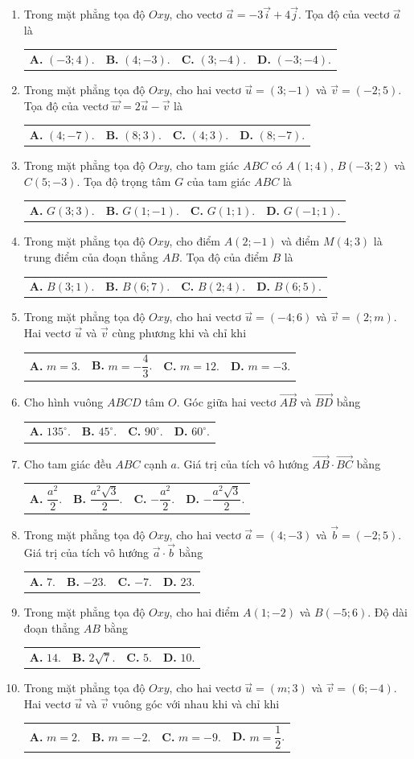 \documentclass[10pt,a4paper]{article}
\makeatletter
\newcommand{\four}[4]{\par\noindent\begin{tabularx}{\linewidth}{@{}*{4}{>{\raggedright\arraybackslash}X}@{}}\textbf{A.} #1&\textbf{B.} #2&\textbf{C.} #3&\textbf{D.} #4\end{tabularx}}
\makeatother
\begin{document}
\begin{enumerate}
\item Trong mặt phẳng tọa độ $Oxy$, cho vectơ $\vec{a} = -3\vec{i} + 4\vec{j}$. Tọa độ của vectơ $\vec{a}$ là
\four{$(-3; 4)$.}{$(4; -3)$.}{$(3; -4)$.}{$(-3; -4)$.}

\item Trong mặt phẳng tọa độ $Oxy$, cho hai vectơ $\vec{u} = (3; -1)$ và $\vec{v} = (-2; 5)$. Tọa độ của vectơ $\vec{w} = 2\vec{u} - \vec{v}$ là
\four{$(4; -7)$.}{$(8; 3)$.}{$(4; 3)$.}{$(8; -7)$.}

\item Trong mặt phẳng tọa độ $Oxy$, cho tam giác $ABC$ có $A(1; 4)$, $B(-3; 2)$ và $C(5; -3)$. Tọa độ trọng tâm $G$ của tam giác $ABC$ là
\four{$G(3; 3)$.}{$G(1; -1)$.}{$G(1; 1)$.}{$G(-1; 1)$.}

\item Trong mặt phẳng tọa độ $Oxy$, cho điểm $A(2; -1)$ và điểm $M(4; 3)$ là trung điểm của đoạn thẳng $AB$. Tọa độ của điểm $B$ là
\four{$B(3; 1)$.}{$B(6; 7)$.}{$B(2; 4)$.}{$B(6; 5)$.}
\pagebreak

\item Trong mặt phẳng tọa độ $Oxy$, cho hai vectơ $\vec{u} = (-4; 6)$ và $\vec{v} = (2; m)$. Hai vectơ $\vec{u}$ và $\vec{v}$ cùng phương khi và chỉ khi
\four{$m = 3$.}{$m = -\dfrac{4}{3}$.}{$m = 12$.}{$m = -3$.}

\item Cho hình vuông $ABCD$ tâm $O$. Góc giữa hai vectơ $\vec{AB}$ và $\vec{BD}$ bằng
\four{$135^\circ$.}{$45^\circ$.}{$90^\circ$.}{$60^\circ$.}

\item Cho tam giác đều $ABC$ cạnh $a$. Giá trị của tích vô hướng $\vec{AB} \cdot \vec{BC}$ bằng
\four{$\dfrac{a^2}{2}$.}{$\dfrac{a^2\sqrt{3}}{2}$.}{$-\dfrac{a^2}{2}$.}{$-\dfrac{a^2\sqrt{3}}{2}$.}

\item Trong mặt phẳng tọa độ $Oxy$, cho hai vectơ $\vec{a} = (4; -3)$ và $\vec{b} = (-2; 5)$. Giá trị của tích vô hướng $\vec{a} \cdot \vec{b}$ bằng
\four{$7$.}{$-23$.}{$-7$.}{$23$.}

\item Trong mặt phẳng tọa độ $Oxy$, cho hai điểm $A(1; -2)$ và $B(-5; 6)$. Độ dài đoạn thẳng $AB$ bằng
\four{$14$.}{$2\sqrt{7}$.}{$5$.}{$10$.}

\item Trong mặt phẳng tọa độ $Oxy$, cho hai vectơ $\vec{u} = (m; 3)$ và $\vec{v} = (6; -4)$. Hai vectơ $\vec{u}$ và $\vec{v}$ vuông góc với nhau khi và chỉ khi
\four{$m = 2$.}{$m = -2$.}{$m = -9$.}{$m = \dfrac{1}{2}$.}


\end{enumerate}
\end{document}
